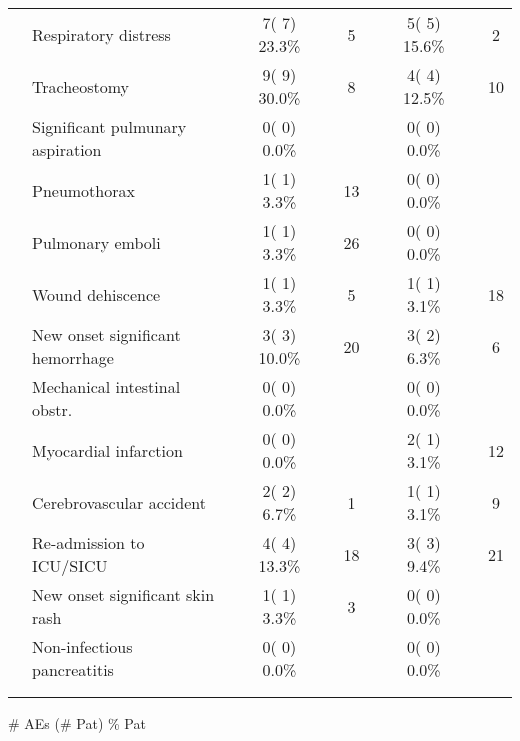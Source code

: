 \documentclass[dvips,10pt]{article}
\begin{document}
\begin{table}[t]
\begin{center}
\begin{tabular}{ @{}l@{}
@{}l@{}@{}p{1.5em}@{}@{}c@{}@{}p{1.5em}@{}@{}c@{}@{}p{1.5em}@{}@{}c@{}@{}p{1.5em}@{}@{}c@{}
}
\\
& Respiratory distress && 7(  7) 23.3\% && 5 && 5(  5) 15.6\% && 2 \\
& Tracheostomy && 9(  9) 30.0\% && 8 && 4(  4) 12.5\% && 10 \\
& Significant pulmunary aspiration && 0(  0)  0.0\% &&  && 0(  0)  0.0\% &&  \\
& Pneumothorax && 1(  1)  3.3\% && 13 && 0(  0)  0.0\% &&  \\
& Pulmonary emboli && 1(  1)  3.3\% && 26 && 0(  0)  0.0\% &&  \\
& Wound dehiscence && 1(  1)  3.3\% && 5 && 1(  1)  3.1\% && 18 \\
& New onset significant hemorrhage && 3(  3) 10.0\% && 20 && 3(  2)  6.3\% && 6 \\
& 
Mechanical intestinal obstr. && 0(  0)  0.0\% &&  && 0(  0)  0.0\% &&  \\
& Myocardial infarction && 0(  0)  0.0\% &&  && 2(  1)  3.1\% && 12 \\
& Cerebrovascular accident && 2(  2)  6.7\% && 1 && 1(  1)  3.1\% && 9 \\
& Re-admission to ICU/SICU && 4(  4) 13.3\% && 18 && 3(  3)  9.4\% && 21 \\
& New onset significant skin rash && 1(  1)  3.3\% && 3 && 0(  0)  0.0\% &&  \\
& 
Non-infectious pancreatitis && 0(  0)  0.0\% &&  && 0(  0)  0.0\% &&  \\
\\
\hline \\

\end{tabular}


\parbox{ 5in }{ \# AEs (\# Pat) \% Pat } \\
 \vspace{1em}\end{center}
 \end{table}
\end{document}
